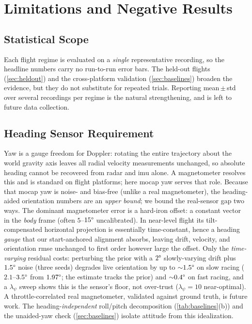 \section{Limitations and Negative Results}
\label{sec:limits}

\subsection{Statistical Scope}
\label{sec:stat_scope}
Each flight regime is evaluated on a \emph{single} representative
recording, so the headline numbers carry no run-to-run error bars.  The
held-out flights (\autoref{sec:heldout}) and the cross-platform validation
(\autoref{sec:baselines}) broaden the evidence, but they do not substitute
for repeated trials.  Reporting
mean\,$\pm$\,std over several recordings per regime is the natural
strengthening, and is left to future data collection.

\subsection{Heading Sensor Requirement}
\label{sec:yaw}
Yaw is a gauge freedom for Doppler: rotating the entire trajectory
about the world gravity axis leaves all radial velocity measurements
unchanged, so absolute heading cannot be recovered from radar and \ac{imu}
alone.  A magnetometer resolves this and is standard on flight platforms;
here \ac{mocap} yaw serves that role.  Because that
\ac{mocap} yaw is noise- and bias-free (unlike a real magnetometer),
the heading-aided orientation numbers are an \emph{upper bound}; we bound
the real-sensor gap two ways.  The dominant magnetometer error is a hard-iron
offset: a constant vector in the \emph{body} frame (often $5$--$15\degree$
uncalibrated).  In near-level flight its tilt-compensated horizontal
projection is essentially time-constant, hence a heading \emph{gauge} that
our start-anchored alignment absorbs, leaving drift, velocity, and
orientation \ac{rmse} unchanged to first order however large the offset.
Only the \emph{time-varying} residual costs: perturbing the prior with a
$2\degree$ slowly-varying drift plus $1.5\degree$ noise (three seeds) degrades
live orientation by up to ${\sim}1.5\degree$ on slow racing ($2.1$--$3.5\degree$
from $1.97\degree$; the estimate tracks the prior) and ${\sim}0.4\degree$ on
fast racing, and a $\lambda_\psi$ sweep shows this is the sensor's floor, not
over-trust ($\lambda_\psi{=}10$ near-optimal).  A throttle-correlated real
magnetometer, validated against ground truth, is future work.  The
heading-\emph{independent} roll/pitch decomposition
(\autoref{tab:baselines}(b)) and the unaided-yaw check (\autoref{sec:baselines})
isolate attitude from this idealization.

